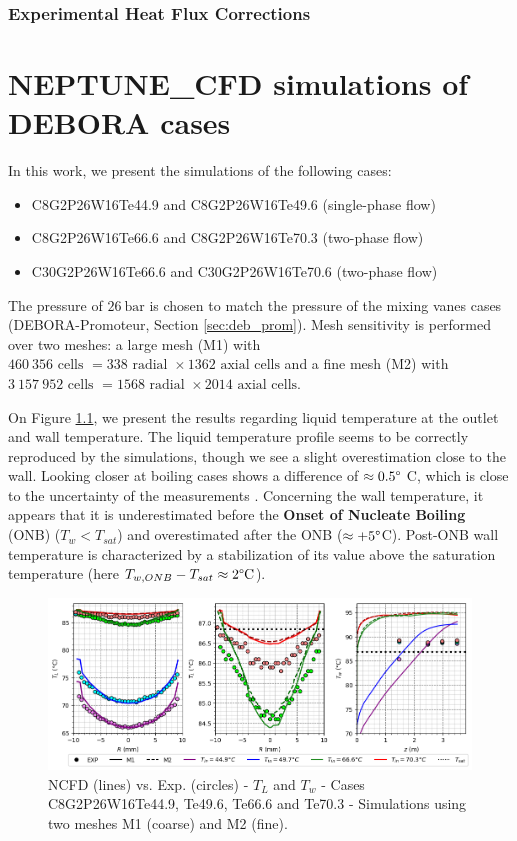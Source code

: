 \subsection{Experimental Heat Flux Corrections}

\chapter{NEPTUNE\_CFD simulations of DEBORA cases}

In this work, we present the simulations of the following cases:
\begin{itemize}
\item C8G2P26W16Te44.9 and C8G2P26W16Te49.6 (single-phase flow)
\item C8G2P26W16Te66.6 and C8G2P26W16Te70.3 (two-phase flow)
\item C30G2P26W16Te66.6 and C30G2P26W16Te70.6 (two-phase flow)
\end{itemize}

The pressure of $26~\text{bar}$ is chosen to match the pressure of the mixing vanes cases (DEBORA-Promoteur, Section \ref{sec:deb_prom}). Mesh sensitivity is performed over two meshes: a large mesh (M1) with $460~356\text{ cells }=338\text{ radial } \times 1362 \text{ axial cells}$ and a fine mesh (M2) with $3~157~952\text{ cells }=1568\text{ radial } \times 2014 \text{ axial cells}$.

On Figure \ref{fig:th_1phi_res}, we present the results regarding liquid temperature at the outlet and wall temperature. The liquid temperature profile seems to be correctly reproduced by the simulations, though we see a slight overestimation close to the wall. Looking closer at boiling cases shows a difference of $\approx 0.5\degree$ C, which is close to the uncertainty of the measurements \cite{Garnier2001}. Concerning the wall temperature, it appears that it is underestimated before the \textbf{Onset of Nucleate Boiling} (ONB) ($T_{w}<T_{sat}$) and overestimated after the ONB ($\approx +5\degree$C). Post-ONB wall temperature is characterized by a stabilization of its value above the saturation temperature (here $T_{w,ONB}-T_{sat}\approx 2\degree\text{C}$).

%
\begin{figure}[h!]
\centering
\includegraphics[scale=0.60]{img/DEBORA/c8.png}
\caption{NCFD (lines) vs. Exp. (circles) - $T_{L}$ and $T_{w}$ - Cases C8G2P26W16Te44.9, Te49.6, Te66.6 and Te70.3 - Simulations using two meshes M1 (coarse) and M2 (fine).}
\label{fig:th_1phi_res}
\end{figure}
%

